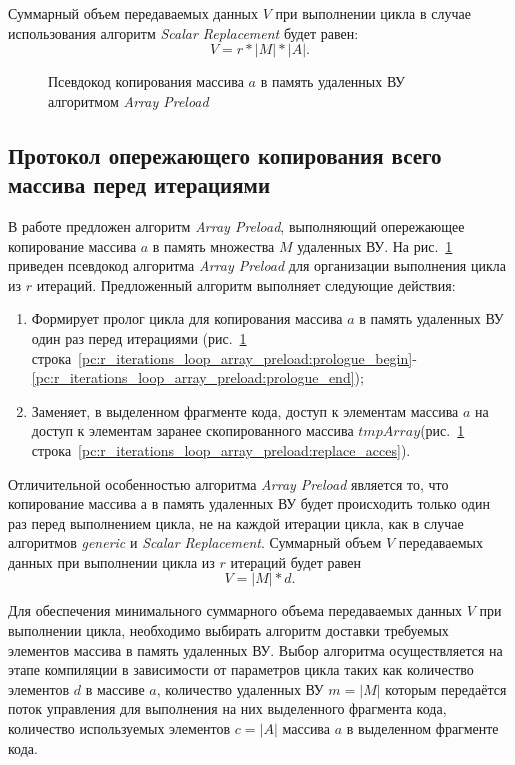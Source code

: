 Суммарный объем передаваемых данных $V$ при выполнении цикла в случае 
использования алгоритм \textit{Scalar Replacement} будет равен:
\[ V = r * |M| * |A|. \]

\begin{figure}[!h]
	
    \caption{Псевдокод копирования массива $a$ в память удаленных ВУ алгоритмом 
\textit{Array Preload}}
    \label{list:r_iterations_loop_array_preload}
\end{figure}

\subsection{Протокол опережающего копирования всего массива перед итерациями}
В работе предложен алгоритм \textit{Array Preload}, выполняющий опережающее 
копирование массива $a$ в память множества $M$ удаленных ВУ. На 
рис.~\ref{list:r_iterations_loop_array_preload} приведен псевдокод алгоритма 
\textit{Array Preload} для организации выполнения цикла из $r$ итераций. 
Предложенный алгоритм выполняет следующие действия:
\begin{enumerate}
\item Формирует пролог цикла для копирования массива $a$ в память удаленных ВУ 
один раз перед итерациями (рис.~\ref{list:r_iterations_loop_array_preload} 
строка~\ref{pc:r_iterations_loop_array_preload:prologue_begin}-
\ref{pc:r_iterations_loop_array_preload:prologue_end});
\item Заменяет, в выделенном фрагменте кода, доступ к элементам массива $a$ на 
доступ к элементам заранее скопированного массива 
$tmpArray$(рис.~\ref{list:r_iterations_loop_array_preload} 
строка~\ref{pc:r_iterations_loop_array_preload:replace_acces}).
\end{enumerate}

Отличительной особенностью алгоритма \textit{Array Preload} является то, что 
копирование массива $а$ в память удаленных ВУ будет происходить только один раз 
перед выполнением цикла, не на каждой итерации цикла, как в случае алгоритмов 
\textit{generic} и \textit{Scalar Replacement}. Суммарный объем $V$ передаваемых
данных при выполнении цикла из $r$ итераций будет равен 
\[ V= |M| * d. \]

Для обеспечения минимального суммарного объема передаваемых данных $V$ при 
выполнении цикла, необходимо выбирать алгоритм доставки требуемых элементов 
массива в память удаленных ВУ. Выбор алгоритма осуществляется на этапе 
компиляции в зависимости от параметров цикла таких как количество элементов $d$ 
в массиве $a$, количество удаленных ВУ  $m = |M|$ которым передаётся поток 
управления для выполнения на них выделенного фрагмента кода, количество 
используемых элементов $c = |A|$ массива $a$ в выделенном фрагменте кода.

